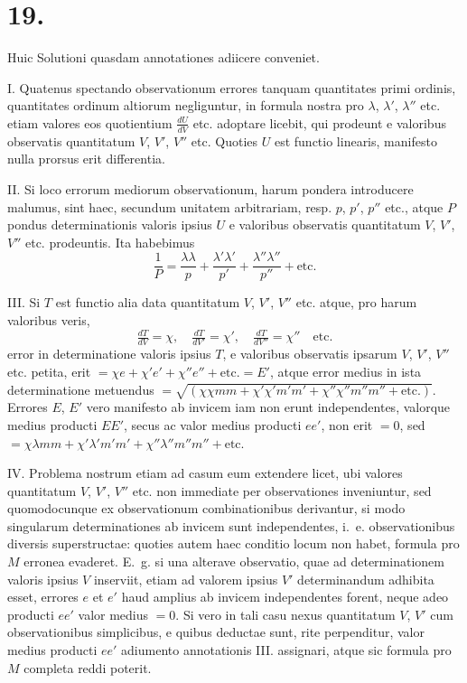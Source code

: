 \documentclass[12pt,a4paper]{book}
\begin{document}
\section*{19.}
\label{sec:art19}

Huic Solutioni quasdam annotationes adiicere conveniet.

\textsc{I.} Quatenus spectando observationum errores tanquam quantitates primi ordinis, quantitates ordinum altiorum negliguntur, in formula nostra pro $\lambda$, $\lambda'$, $\lambda''$ etc. etiam valores eos quotientium $\tfrac{dU}{dV}$ etc. adoptare licebit, qui prodeunt e valoribus observatis quantitatum $V$, $V'$, $V''$ etc. Quoties $U$ est functio linearis, manifesto nulla prorsus erit differentia.

\textsc{II.} Si loco errorum mediorum observationum, harum pondera introducere malumus, sint haec, secundum unitatem arbitrariam, resp. $p$, $p'$, $p''$ etc., atque $P$ pondus determinationis valoris ipsius $U$ e valoribus observatis quantitatum $V$, $V'$, $V''$ etc. prodeuntis. Ita habebimus
%
\begin{equation*}
\frac{1}{P}=\frac{\lambda\lambda}{p}+\frac{\lambda'\lambda'}{p'}+\frac{\lambda''\lambda''}{p''}+\text{etc.}
\end{equation*}

\textsc{III.} Si $T$ est functio alia data quantitatum $V$, $V'$, $V''$ etc. atque, pro harum valoribus veris,
%
\begin{equation*}
\tfrac{dT}{dV}=\chi,\quad\tfrac{dT}{dV'}=\chi',\quad\tfrac{dT}{dV''}=\chi''\quad\text{etc.}
\end{equation*}
error in determinatione valoris ipsius $T$, e valoribus observatis ipsarum $V$, $V'$, $V''$ etc. petita, erit $=\chi e+\chi'e'+\chi''e''+\text{etc.}=E'$, atque error medius in ista determinatione metuendus $=\sqrt{(\chi\chi mm+\chi'\chi'm'm'+\chi''\chi''m''m''+\text{etc.})}$. Errores $E$, $E'$ vero manifesto ab invicem iam non erunt independentes, valorque medius producti $EE'$, secus ac valor medius producti $ee'$, non erit $=0$, sed $=\chi\lambda mm+\chi'\lambda'm'm'+\chi''\lambda''m''m''+\text{etc.}$

\textsc{IV.} Problema nostrum etiam ad casum eum extendere licet, ubi valores quantitatum $V$, $V'$, $V''$ etc. non immediate per observationes inveniuntur, sed quomodocunque ex observationum combinationibus derivantur, si modo singularum determinationes ab invicem sunt independentes, i.~e. observationibus diversis superstructae: quoties autem haec conditio locum non habet, formula pro $M$ erronea evaderet. E.~g. si una alterave observatio, quae ad determinationem valoris ipsius $V$ inserviit, etiam ad valorem ipsius $V'$ determinandum adhibita esset, errores $e$ et $e'$ haud amplius ab invicem independentes forent, neque adeo producti $ee'$ valor medius $=0$. Si vero in tali casu nexus quantitatum $V$, $V'$ cum observationibus simplicibus, e quibus deductae sunt, rite perpenditur, valor medius producti $ee'$ adiumento annotationis \textsc{III.} assignari, atque sic formula pro $M$ completa reddi poterit.
\end{document}
